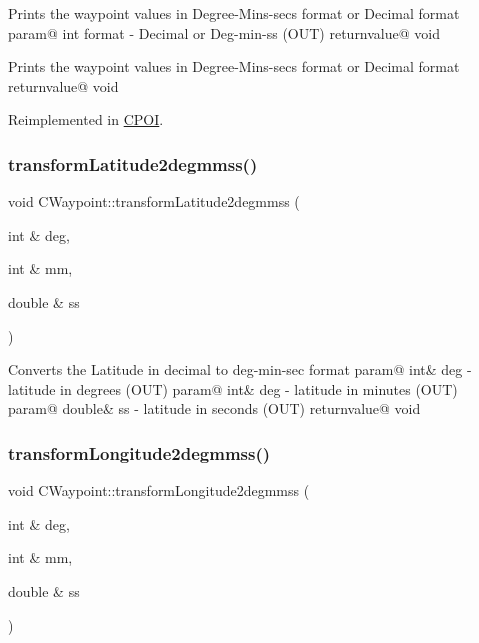 Prints the waypoint values in Degree-\/\+Mins-\/secs format or Decimal format param@ int format -\/ Decimal or Deg-\/min-\/ss (O\+UT) returnvalue@ void

Prints the waypoint values in Degree-\/\+Mins-\/secs format or Decimal format returnvalue@ void 

Reimplemented in \hyperlink{classCPOI_a2b65d12e722c89a8a105620726195d10}{C\+P\+OI}.

\mbox{\label{classCWaypoint_aec530aa8f453abd22cf41d8a6c6080f2}} 
\subsubsection{\texorpdfstring{transform\+Latitude2degmmss()}{transformLatitude2degmmss()}}
{\footnotesize\ttfamily void C\+Waypoint\+::transform\+Latitude2degmmss (\begin{DoxyParamCaption}\item[{int \&}]{deg,  }\item[{int \&}]{mm,  }\item[{double \&}]{ss }\end{DoxyParamCaption})}

Converts the Latitude in decimal to deg-\/min-\/sec format param@ int\& deg -\/ latitude in degrees (O\+UT) param@ int\& deg -\/ latitude in minutes (O\+UT) param@ double\& ss -\/ latitude in seconds (O\+UT) returnvalue@ void \mbox{\label{classCWaypoint_aba26f2ba294cf5bb5bd0be1d9fdb1214}} 
\subsubsection{\texorpdfstring{transform\+Longitude2degmmss()}{transformLongitude2degmmss()}}
{\footnotesize\ttfamily void C\+Waypoint\+::transform\+Longitude2degmmss (\begin{DoxyParamCaption}\item[{int \&}]{deg,  }\item[{int \&}]{mm,  }\item[{double \&}]{ss }\end{DoxyParamCaption})}


